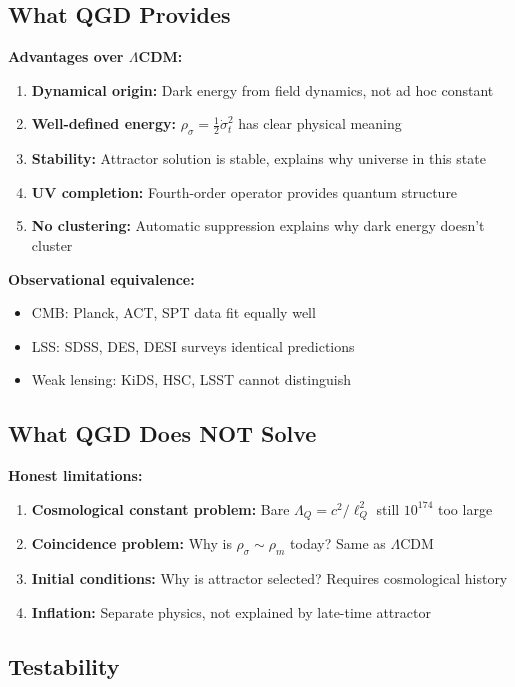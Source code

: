 \documentclass[11pt,a4paper]{article}
\theoremstyle{definition}
\theoremstyle{remark}
\begin{document}
	\subsection{What QGD Provides}
	
	\textbf{Advantages over $\Lambda$CDM:}
	\begin{enumerate}
		\item \textbf{Dynamical origin:} Dark energy from field dynamics, not ad hoc constant
		\item \textbf{Well-defined energy:} $\rho_\sigma = \frac{1}{2}\dot{\sigma}_t^2$ has clear physical meaning
		\item \textbf{Stability:} Attractor solution is stable, explains why universe in this state
		\item \textbf{UV completion:} Fourth-order operator provides quantum structure
		\item \textbf{No clustering:} Automatic suppression explains why dark energy doesn't cluster
	\end{enumerate}
	
	\textbf{Observational equivalence:}
	\begin{itemize}
		\item CMB: Planck, ACT, SPT data fit equally well
		\item LSS: SDSS, DES, DESI surveys identical predictions
		\item Weak lensing: KiDS, HSC, LSST cannot distinguish
	\end{itemize}
	
	\subsection{What QGD Does NOT Solve}
	
	\textbf{Honest limitations:}
	\begin{enumerate}
		\item \textbf{Cosmological constant problem:} Bare $\Lambda_Q = c^2/\ell_Q^2$ still $10^{174}$ too large
		\item \textbf{Coincidence problem:} Why is $\rho_\sigma \sim \rho_m$ today? Same as $\Lambda$CDM
		\item \textbf{Initial conditions:} Why is attractor selected? Requires cosmological history
		\item \textbf{Inflation:} Separate physics, not explained by late-time attractor
	\end{enumerate}
	
	\subsection{Testability}
	
\end{document}
